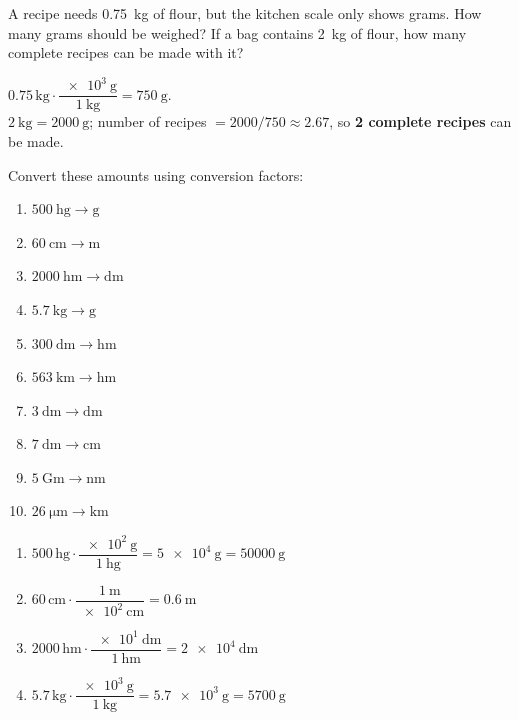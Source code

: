 \begin{exercise}
    A recipe needs \qty{0.75}{\kg} of flour, but the kitchen scale only shows grams. How many grams should be weighed? If a bag contains \qty{2}{\kg} of flour, how many complete recipes can be made with it?
    \begin{solu}
        \(\num{0.75}\,\unit{\kg} \cdot \dfrac{\qty{e3}{\g}}{\qty{1}{\kg}} = \qty{750}{\g}\). \\
        \(\qty{2}{\kg} = \qty{2000}{\g}\); number of recipes \(= 2000 / 750 \approx \num{2.67}\), so \textbf{2 complete recipes} can be made.
    \end{solu}
\end{exercise}

\begin{exercise}
    Convert these amounts using conversion factors:
    \begin{enumerate}[label=\letraminuscula]
        \item \(\qty{500}{\hecto\gram} \to \unit{\g}\)
        \item \(\qty{60}{\cm} \to \unit{\m}\)
        \item \(\qty{2000}{\hecto\m} \to \unit{\deca\m}\)
        \item \(\qty{5.7}{\kg} \to \unit{\g}\)
        \item \(\qty{300}{\dm} \to \unit{\hecto\m}\)
        \item \(\qty{563}{\km} \to \unit{\hecto\m}\)
        \item \(\qty{3}{\dm} \to \unit{\deca\m}\)
        \item \(\qty{7}{\dm} \to \unit{\cm}\)
        \item \(\qty{5}{\giga\m} \to \unit{\nano\m}\)
        \item \(\qty{26}{\micro\m} \to \unit{\km}\)
    \end{enumerate}
    \begin{solu}
        \begin{enumerate}[label=\alph*)]
            \item \(\num{500}\,\unit{\hecto\gram} \cdot \dfrac{\qty{e2}{\g}}{\qty{1}{\hecto\gram}} = \qty{5e4}{\g} = \qty{50000}{\g}\)
            \item \(\num{60}\,\unit{\cm} \cdot \dfrac{\qty{1}{\m}}{\qty{e2}{\cm}} = \qty{0.6}{\m}\)
            \item \(\num{2000}\,\unit{\hecto\m} \cdot \dfrac{\qty{e1}{\deca\m}}{\qty{1}{\hecto\m}} = \qty{2e4}{\deca\m}\)
            \item \(\num{5.7}\,\unit{\kg} \cdot \dfrac{\qty{e3}{\g}}{\qty{1}{\kg}} = \qty{5.7e3}{\g} = \qty{5700}{\g}\)

\end{enumerate}
\end{solu}
\end{exercise}
